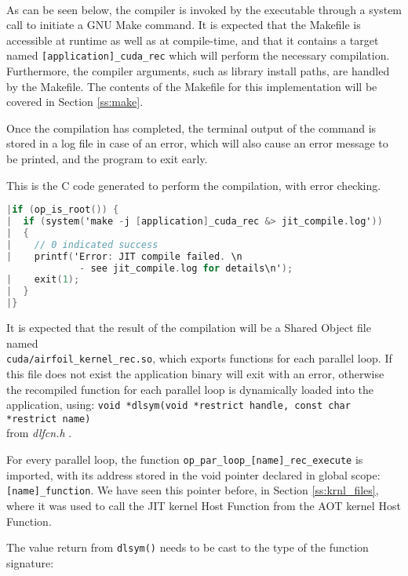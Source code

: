\\
As can be seen below, the compiler is invoked by the executable through a system call to initiate a GNU Make \cite{make} command. It is expected that the Makefile is accessible at runtime as well as at compile-time, and that it contains a target named \verb|[application]_cuda_rec| which will perform the necessary compilation. Furthermore, the compiler arguments, such as library install paths, are handled by the Makefile. The contents of the Makefile for this implementation will be covered in Section \ref{ss:make}.\par
Once the compilation has completed, the terminal output of the command is stored in a log file in case of an error, which will also cause an error message to be printed, and the program to exit early.
\par
\noindent This is the C code generated to perform the compilation, with error checking.
\vspace{1em}
\begin{lstlisting}[backgroundcolor=\color{red!20}, language=C]
|if (op_is_root()) {
|  if (system('make -j [application]_cuda_rec &> jit_compile.log'))
|  {
|    // 0 indicated success
|    printf('Error: JIT compile failed. \n
             - see jit_compile.log for details\n');
|    exit(1);
|  }
|}
\end{lstlisting}
\par
\noindent It is expected that the result of the compilation will be a Shared Object file named\\ \verb|cuda/airfoil_kernel_rec.so|, which exports functions for each parallel loop. If this file does not exist the application binary will exit with an error, otherwise the recompiled function for each parallel loop is dynamically loaded into the application, using: \verb|void *dlsym(void *restrict handle, const char *restrict name)|\\ from \textit{dlfcn.h} \cite{dlopen}.
\par
\noindent For every parallel loop, the function \verb|op_par_loop_[name]_rec_execute| is imported, with its address stored in the void pointer declared in global scope: \verb|[name]_function|. We have seen this pointer before, in Section \ref{ss:krnl_files}, where it was used to call the JIT kernel Host Function from the AOT kernel Host Function.
\par
The value return from \verb|dlsym()| needs to be cast to the type of the function signature:
